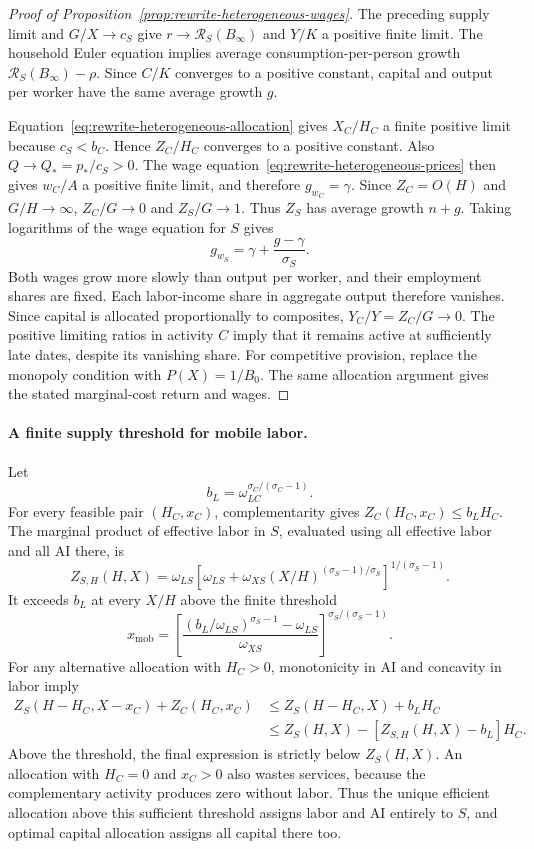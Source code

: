 \begin{proof}[Proof of Proposition~\ref{prop:rewrite-heterogeneous-wages}]
The preceding supply limit and $G/X\to c_S$ give
$r\to\mathcal R_S(B_\infty)$ and $Y/K$ a positive finite limit.
The household Euler equation implies average consumption-per-person growth
$\mathcal R_S(B_\infty)-\rho$. Since $C/K$ converges to a positive
constant, capital and output per worker have the same average growth $g$.

Equation~\eqref{eq:rewrite-heterogeneous-allocation} gives $X_C/H_C$
a finite positive limit because $c_S<b_C$. Hence $Z_C/H_C$ converges to
a positive constant. Also $Q\to Q_*=p_*/c_S>0$.
The wage equation~\eqref{eq:rewrite-heterogeneous-prices} then gives
$w_C/A$ a positive finite limit, and therefore $g_{w_C}=\gamma$.
Since $Z_C=O(H)$ and $G/H\to\infty$, $Z_C/G\to0$ and
$Z_S/G\to1$. Thus $Z_S$ has average growth $n+g$.
Taking logarithms of the wage equation for $S$ gives
\[
 g_{w_S}=\gamma+\frac{g-\gamma}{\sigma_S}.
\]
Both wages grow more slowly than output per worker, and their employment
shares are fixed. Each labor-income share in aggregate output therefore
vanishes. Since capital is allocated proportionally to composites,
$Y_C/Y=Z_C/G\to0$. The positive limiting ratios in activity $C$ imply
that it remains active at sufficiently late dates, despite its vanishing share.
For competitive provision, replace the monopoly condition with $P(X)=1/B_0$.
The same allocation argument gives the stated marginal-cost return and wages.
\end{proof}

\paragraph{A finite supply threshold for mobile labor.}
Let
\[
 b_L=\omega_{LC}^{\sigma_C/(\sigma_C-1)}.
\]
For every feasible pair $(H_C,x_C)$, complementarity gives
$Z_C(H_C,x_C)\leq b_L H_C$.
The marginal product of effective labor in $S$, evaluated using all
effective labor and all AI there, is
\[
 Z_{S,H}(H,X)=\omega_{LS}
 [\omega_{LS}+\omega_{XS}(X/H)^{(\sigma_S-1)/\sigma_S}]^{1/(\sigma_S-1)}.
\]
It exceeds $b_L$ at every $X/H$ above the finite threshold
\begin{equation}
 x_{\mathrm{mob}}=
 \left[
 \frac{(b_L/\omega_{LS})^{\sigma_S-1}-\omega_{LS}}{\omega_{XS}}
 \right]^{\sigma_S/(\sigma_S-1)}.
 \label{eq:rewrite-mobile-threshold}
\end{equation}
For any alternative allocation with $H_C>0$, monotonicity in AI and
concavity in labor imply
\begin{align*}
 Z_S(H-H_C,X-x_C)+Z_C(H_C,x_C)
 &\leq Z_S(H-H_C,X)+b_LH_C\\
 &\leq Z_S(H,X)-[Z_{S,H}(H,X)-b_L]H_C.
\end{align*}
Above the threshold, the final expression is strictly below $Z_S(H,X)$.
An allocation with $H_C=0$ and $x_C>0$ also wastes services, because the
complementary activity produces zero without labor. Thus the unique
efficient allocation above this sufficient threshold assigns labor and AI
entirely to $S$, and optimal capital allocation assigns all capital there too.

